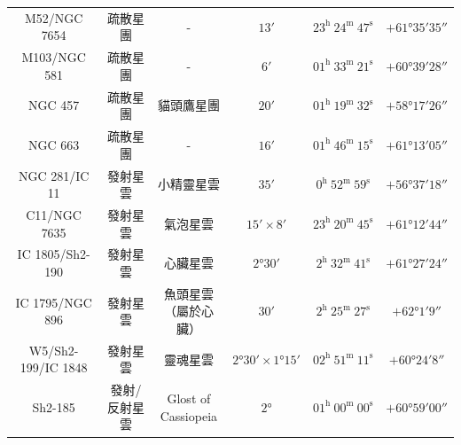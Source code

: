 \begin{center}
\begin{longtable}{c | c | c | c | c | c}
    M52/NGC 7654 & 疏散星團 & - & \(\ang{;13;}\) & \(23^\text{h }24^\text{m }47^\text{s}\) & \(+\ang{61;35;35}\) \\ %
    M103/NGC 581 & 疏散星團 & - & \(\ang{;6;}\) & \(01^\text{h }33^\text{m }21^\text{s}\) & \(+\ang{60;39;28}\) \\ %
    NGC 457 & 疏散星團 & 貓頭鷹星團 & \(\ang{;20;}\) & \(01^\text{h }19^\text{m }32^\text{s}\) & \(+\ang{58;17;26}\) \\ %
    NGC 663 & 疏散星團 & - & \(\ang{;16;}\) & \(01^\text{h }46^\text{m }15^\text{s}\) & \(+\ang{61;13;05}\) \\ %
    NGC 281/IC 11 & 發射星雲 & 小精靈星雲 & \(\ang{;35;}\) & \(0^\text{h }52^\text{m }59^\text{s}\) & \(+\ang{56;37;18}\) \\ %
    C11/NGC 7635 & 發射星雲 & 氣泡星雲 & \(\ang{;15;}\times\ang{;8;}\) & \(23^\text{h }20^\text{m }45^\text{s}\) & \(+\ang{61;12;44}\) \\ %
    IC 1805/Sh2-190 & 發射星雲 & 心臟星雲 & \(\ang{2;30;}\) & \(2^\text{h }32^\text{m }41^\text{s}\) & \(+\ang{61;27;24}\) \\ %
    IC 1795/NGC 896 & 發射星雲 & \makecell{魚頭星雲\\（屬於心臟）} & \(\ang{;30;}\) & \(2^\text{h }25^\text{m }27^\text{s}\) & \(+\ang{62;1;9}\) \\ %
    W5/Sh2-199/IC 1848 & 發射星雲 & 靈魂星雲 & \(\ang{2;30;}\times\ang{1;15;}\) & \(02^\text{h }51^\text{m }11^\text{s}\) & \(+\ang{60;24;8}\) \\ %
    Sh2-185 & 發射/反射星雲 & \makecell{Glost of\\Cassiopeia} & \(\ang{2;;}\) & \(01^\text{h }00^\text{m }00^\text{s}\) & \(+\ang{60;59;00}\)
\end{longtable}
\end{center}

